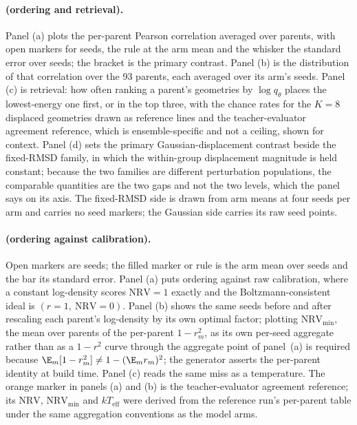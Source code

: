 \paragraph{ (ordering and retrieval).} Panel (a) plots the
per-parent Pearson correlation averaged over parents, with open markers for seeds,
the rule at the arm mean and the whisker the standard error over seeds; the bracket
is the primary contrast. Panel (b) is the distribution of that correlation over the
93 parents, each averaged over its arm's seeds. Panel (c) is retrieval: how often
ranking a parent's geometries by $\log q_\theta$ places the lowest-energy one first,
or in the top three, with the chance rates for the $K = 8$ displaced geometries drawn
as reference lines and the teacher-evaluator agreement reference, which is ensemble-specific and
not a ceiling, shown for context. Panel (d) sets the primary Gaussian-displacement
contrast beside the fixed-RMSD family, in which the within-group displacement
magnitude is held constant; because the two families are different perturbation
populations, the comparable quantities are the two gaps and not the two levels, which
the panel says on its axis. The fixed-RMSD side is drawn from arm means at four seeds
per arm and carries no seed markers; the Gaussian side carries its raw seed points.

\paragraph{ (ordering against calibration).} Open markers are
seeds; the filled marker or rule is the arm mean over seeds and the bar its standard
error. Panel (a) puts ordering against raw calibration, where a constant log-density
scores $\mathrm{NRV} = 1$ exactly and the Boltzmann-consistent ideal is
$(r = 1,\ \mathrm{NRV} = 0)$. Panel (b) shows the same seeds before and after
rescaling each parent's log-density by its own optimal factor; plotting
$\mathrm{NRV}_{\min}$, the mean over parents of the per-parent $1 - r_m^2$, as its
own per-seed aggregate rather than as a $1 - r^2$ curve through the aggregate point
of panel~(a) is required because $\E_m[1 - r_m^2] \neq 1 - (\E_m r_m)^2$; the
generator asserts the per-parent identity at build time. Panel (c) reads the same
miss as a temperature. The orange marker in panels (a) and (b) is the teacher-evaluator agreement
reference; its $\mathrm{NRV}$, $\mathrm{NRV}_{\min}$ and $kT_{\mathrm{eff}}$ were
derived from the reference run's per-parent table under the same aggregation
conventions as the model arms.


